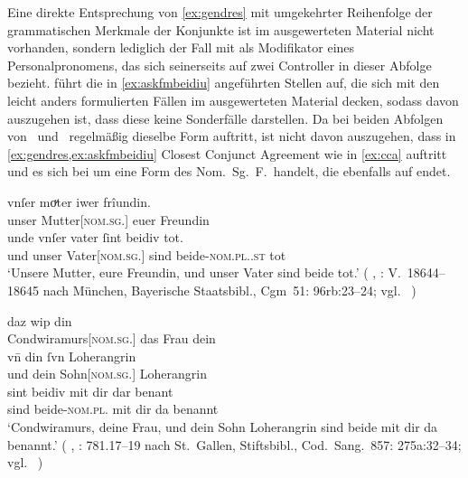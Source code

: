 Eine direkte Entsprechung von \cref{ex:gendres} mit umgekehrter Reihenfolge der
grammatischen Merkmale der Konjunkte ist im ausgewerteten Material nicht
vorhanden, sondern lediglich der Fall mit  als Modifikator
eines Personalpronomens, das sich seinerseits auf zwei Controller in dieser
Abfolge bezieht. \citet[96, 145]{askedal1973} führt die in
\cref{ex:askfmbeidiu} angeführten Stellen auf, die sich mit den leicht anders
formulierten Fällen im ausgewerteten Material decken, sodass davon auszugehen
ist, dass diese keine Sonderfälle darstellen. Da bei beiden Abfolgen von
\MascM\ und \FemF\ regelmäßig dieselbe Form  auftritt, ist nicht
davon auszugehen, dass in \cref{ex:gendres,ex:askfmbeidiu} Closest Conjunct
Agreement wie in \cref{ex:cca} auftritt und es sich bei  um eine
Form des Nom.~Sg.~F.\ handelt, die ebenfalls auf  endet.

\begin{exe}
	\ex \label{ex:askfmbeidiu}
		\begin{xlist}
		\ex \gll vnſer moͮter iwer frîundin. \\
				unser Mutter[\textsc{nom.sg.\FemF}] euer Freundin \\
		\sn \gll unde vnſer vater ſint beidiv tot. \\
				und unser Vater[\textsc{nom.sg.\MascM}] sind beide-\textsc{nom.pl.\NeutMF.st} 
					tot \\
			\trans `Unsere Mutter, eure Freundin, und unser Vater sind beide
				tot.'
				(%
					, : V.~18644--18645
					nach München, Bayerische Staatsbibl., Cgm~51: 96rb:23--24;
					vgl.~\cite[259]{maroldschroeder1969}%
				)
			\label{ex:askfmbeidiu_1}
	
		\ex {} daz wip din \\
				Condwiramurs[\textsc{nom.sg.\FemF}] das Frau dein \\
		\sn \gll vn̄ din ſvn Loherangrin \\
				und dein Sohn[\textsc{nom.sg.\MascM}] Loherangrin \\
		\sn \gll sint beidiv mit dir dar benant \\
				sind beide-\textsc{nom.pl.\NeutMF} mit dir da benannt \\
		\trans `Condwiramurs, deine Frau, und dein Sohn Loherangrin
			sind beide mit dir da benannt.'
			(%
				, : 781.17--19
				nach St.~Gallen, Stiftsbibl., Cod.~Sang.~857: 275a:32--34;
				vgl.~\cite[785]{knechtschirok2003}%
			)
			\label{ex:askfmbeidiu_2}
	\end{xlist}
\end{exe}

